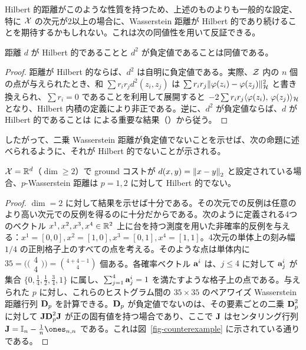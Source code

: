Hilbert 的距離がこのような性質を持つため、上述のものよりも一般的な設定、特に $\mathcal{X}$ の次元が2以上の場合に、Wasserstein 距離が Hilbert 的であり続けることを期待するかもしれない。これは次の同値性を用いて反証できる。

\begin{prop}\label{prop-negative-definite} 距離 $d$ が Hilbert 的であることと $d^2$ が負定値であることは同値である。
\end{prop}
\begin{proof} 距離が Hilbert 的ならば、$d^2$ は自明に負定値である。実際、$\mathcal{Z}$ 内の $n$ 個の点が与えられたとき、和 $\sum r_i r_j d^2(z_i,z_j)$ は $\sum r_i r_j \|\tphi(z_i)-\tphi(z_j)\|_\RKHS^2$ と書き換えられ、$\sum r_i=0$ であることを利用して展開すると $-2\sum r_i r_j \dotp{\tphi(z_i)}{\tphi(z_j)}_\RKHS$ となり、Hilbert 内積の定義により非正である。逆に、$d^2$ が負定値ならば、$d$ が Hilbert 的であることは \citet{schoenberg38} による重要な結果（\cite[p. 82, Prop. 3.2]{berg84harmonic}）から従う。
\end{proof}

したがって、二乗 Wasserstein 距離が負定値でないことを示せば、次の命題に述べられるように、それが Hilbert 的でないことが示される。

\begin{prop}\label{prop-negative-definite-negative} $\mathcal{X}=\mathbb{R}^d$（$\dim\geq 2$）で ground コストが $d(x,y)=\left\| x-y \right\|_2$ と設定されている場合、$p$-Wasserstein 距離は $p=1,2$ に対して Hilbert 的でない。
\end{prop}

\begin{proof} $\dim=2$ に対して結果を示せば十分である。その次元での反例は任意のより高い次元での反例を得るのに十分だからである。次のように定義される4つのベクトル $x^1, x^2,x^3,x^4\in\mathbb{R}^{2}$ 上に台を持つ測度を用いた非確率的反例を与える：$x^{1}=[0,0], x^{2}=[1,0], x^{3}=[0,1], x^{4}=[1,1]$。4次元の単体上の刻み幅 $1/4$ の正則格子上のすべての点を考える。そのような点は単体内に $35=\bigl(\!\bigl(\substack{4\\4}\bigl)\!\bigl)=\binom{4+4-1}{4}$ 個ある。各確率ベクトル $\mathrm{\textbf{a}}^i$ は、$j\leq 4$ に対して $\mathrm{\textbf{a}}^i_j$ が集合 $\{0,\tfrac{1}{4},\tfrac{1}{2},\tfrac{3}{4},1\}$ に属し、$\sum_{j=1}^4\mathrm{\textbf{a}}^i_j=1$ を満たすような格子上の点である。与えられた $p$ に対し、これらのヒストグラム間の $35\times 35$ のペアワイズ Wasserstein 距離行列 $\mathrm{\textbf{D}}_p$ を計算できる。$\mathrm{\textbf{D}}_p$ が負定値でないのは、その要素ごとの二乗 $\mathrm{\textbf{D}}_p^2$ に対して $\mathrm{\textbf{J}} \mathrm{\textbf{D}}_p^2 \mathrm{\textbf{J}}$ が正の固有値を持つ場合であり、ここで $\mathrm{\textbf{J}}$ はセンタリング行列 $\J=\Identity_n-\tfrac{1}{n}\ones_{n,n}$ である。これは図~\ref{fig-counterexample} に示されている通りである。
\end{proof}

